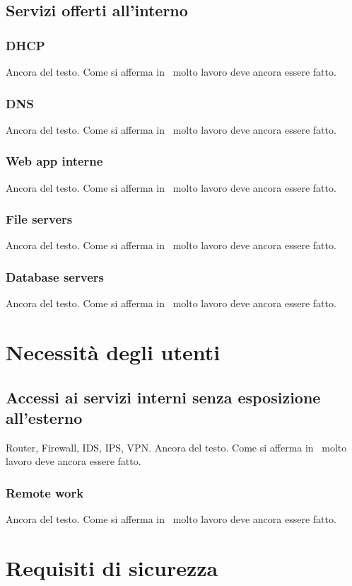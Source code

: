 \subsection{Servizi offerti all'interno}
\subsubsection{DHCP}
Ancora del testo. Come si afferma in~\cite{jones96analysis} molto lavoro deve ancora essere fatto.
\subsubsection{DNS}
Ancora del testo. Come si afferma in~\cite{jones96analysis} molto lavoro deve ancora essere fatto.
\subsubsection{Web app interne}
Ancora del testo. Come si afferma in~\cite{jones96analysis} molto lavoro deve ancora essere fatto.
\subsubsection{File servers}
Ancora del testo. Come si afferma in~\cite{jones96analysis} molto lavoro deve ancora essere fatto.
\subsubsection{Database servers}
Ancora del testo. Come si afferma in~\cite{jones96analysis} molto lavoro deve ancora essere fatto.

\section{Necessità degli utenti}
\subsection{Accessi ai servizi interni senza esposizione all'esterno}
Router, Firewall, IDS, IPS, VPN. Ancora del testo. Come si afferma in~\cite{jones96analysis} molto lavoro deve ancora essere fatto.
\subsubsection{Remote work}
Ancora del testo. Come si afferma in~\cite{jones96analysis} molto lavoro deve ancora essere fatto.

\section{Requisiti di sicurezza}
